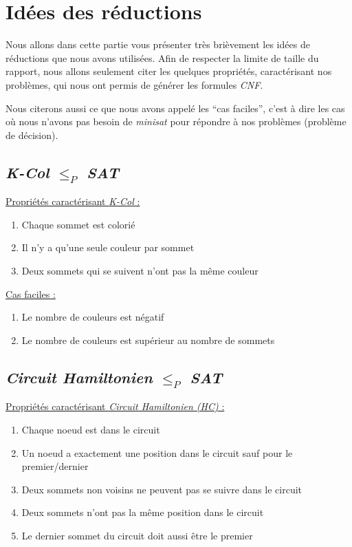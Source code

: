  \section{Idées des réductions}
 Nous allons dans cette partie vous présenter très brièvement les idées
 de réductions que nous avons utilisées. Afin de respecter la limite de
 taille du rapport, nous allons seulement citer les quelques propriétés,
 caractérisant nos problèmes, qui nous ont permis de générer les
 formules \emph{CNF}.
 
 Nous citerons aussi ce que nous avons appelé les ``cas
 faciles'', c'est à dire les cas où nous n'avons pas besoin de
 \emph{minisat} pour répondre à nos problèmes (problème de décision).

  \subsection{\emph{K-Col} $\leq_P$ \emph{SAT}}
  \underline{Propriétés caractérisant \emph{K-Col} :}
  \begin{enumerate}
   \item Chaque sommet est colorié
   \item Il n'y a qu'une seule couleur par sommet
   \item Deux sommets qui se suivent n'ont pas la même couleur
  \end{enumerate}

  \underline{Cas faciles :}
  \begin{enumerate}
   \item Le nombre de couleurs est négatif
   \item Le nombre de couleurs est supérieur au nombre de sommets
  \end{enumerate}

  \subsection{\emph{Circuit Hamiltonien} $\leq_P$ \emph{SAT}}
  \underline{Propriétés caractérisant \emph{Circuit Hamiltonien (HC)} :}
  \begin{enumerate}
   \item Chaque noeud est dans le circuit
   \item Un noeud a exactement une position dans le circuit sauf pour le
	 premier/dernier
   \item Deux sommets non voisins ne peuvent pas se suivre dans le
	 circuit
   \item Deux sommets n'ont pas la même position dans le circuit
   \item Le dernier sommet du circuit doit aussi être le premier
  \end{enumerate}


